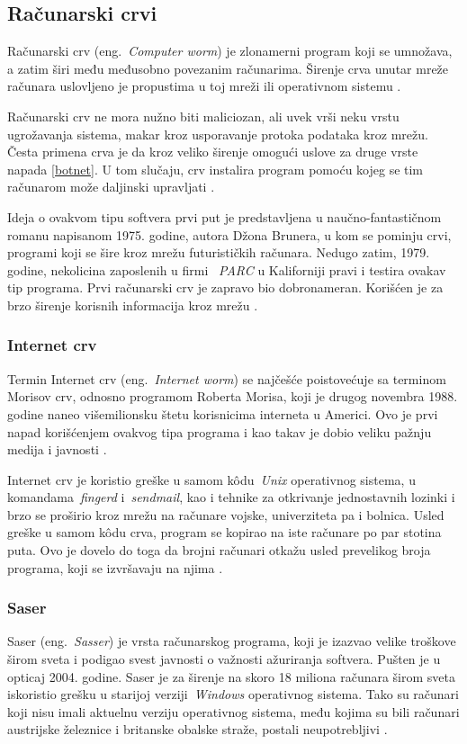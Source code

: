 \documentclass[a4paper]{article}
\begin{document}
\subsection{Računarski crvi}
Računarski crv (eng.~{\em Computer worm}) je zlonamerni program koji se umnožava, a zatim širi među međusobno povezanim računarima. Širenje crva unutar mreže računara uslovljeno je propustima u toj mreži ili operativnom sistemu \cite{norton_worm, ethics}.

Računarski crv ne mora nužno biti maliciozan, ali uvek vrši neku vrstu ugrožavanja sistema, makar kroz usporavanje protoka podataka kroz mrežu. Česta primena crva je da kroz veliko širenje omogući uslove za druge vrste napada \ref{botnet}. U tom slučaju, crv instalira program pomoću kojeg se tim računarom može daljinski upravljati \cite{ethics}.

Ideja o ovakvom tipu softvera prvi put je predstavljena u naučno-fantastičnom romanu napisanom 1975. godine, autora Džona Brunera, u kom se pominju crvi, programi koji se šire kroz mrežu futurističkih računara. Nedugo zatim, 1979. godine, nekolicina zaposlenih u firmi ~{\em PARC} u Kaliforniji pravi i testira ovakav tip programa.
Prvi računarski crv je zapravo bio dobronameran. Korišćen je za brzo širenje korisnih informacija kroz mrežu \cite{internet_worm}. 


\subsubsection{Internet crv}

Termin Internet crv  (eng.~{\em Internet worm}) se najčešće poistovećuje sa terminom Morisov crv, odnosno programom Roberta Morisa, koji je drugog novembra 1988. godine naneo višemilionsku štetu korisnicima interneta u Americi. Ovo je prvi napad korišćenjem ovakvog tipa programa i kao takav je dobio veliku pažnju medija i javnosti \cite{ethics}.

Internet crv je koristio greške u samom kôdu~{\em Unix} operativnog sistema, u komandama~{\em fingerd} i~{\em sendmail}, kao i tehnike za otkrivanje jednostavnih lozinki i brzo se proširio kroz mrežu na računare vojske, univerziteta pa i bolnica. Usled greške u samom kôdu crva, program se kopirao na iste računare po par stotina puta. Ovo je dovelo do toga da brojni računari otkažu usled prevelikog broja programa, koji se izvršavaju na njima \cite{internet_worm}.


\subsubsection{Saser}
Saser (eng.~{\em Sasser}) je vrsta računarskog programa, koji je izazvao velike troškove širom sveta i podigao svest javnosti o važnosti ažuriranja softvera. Pušten je u opticaj 2004. godine. Saser je za širenje na skoro 18 miliona računara širom sveta iskoristio grešku u starijoj verziji~{\em Windows} operativnog sistema. Tako su računari koji nisu imali aktuelnu verziju operativnog sistema, među kojima su bili računari austrijske železnice i britanske obalske straže, postali neupotrebljivi \cite{ethics}.
\end{document}

